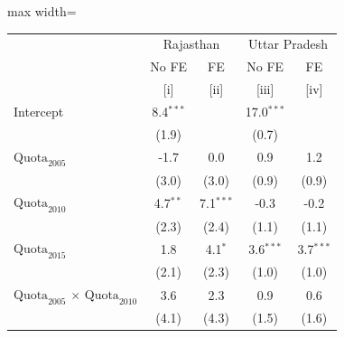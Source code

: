 
\begingroup
\centering
\scriptsize
\begin{adjustbox}{max width=\linewidth}
   \begin{threeparttable}[b]
      \begin{tabular}{lcccc}
         \toprule
          & \multicolumn{2}{c}{Rajasthan} & \multicolumn{2}{c}{Uttar Pradesh} \\
                                                                                                  & No FE       & FE          & No FE        & FE \\
                                                                                                  & [i]         & [ii]        & [iii]        & [iv]\\
         \midrule
         Intercept                                                                                & 8.4$^{***}$ &             & 17.0$^{***}$ &   \\
                                                                                                  & (1.9)       &             & (0.7)        &   \\
         $\text{Quota}_{2005}$                                                                    & -1.7        & 0.0         & 0.9          & 1.2\\
                                                                                                  & (3.0)       & (3.0)       & (0.9)        & (0.9)\\
         $\text{Quota}_{2010}$                                                                    & 4.7$^{**}$  & 7.1$^{***}$ & -0.3         & -0.2\\
                                                                                                  & (2.3)       & (2.4)       & (1.1)        & (1.1)\\
         $\text{Quota}_{2015}$                                                                    & 1.8         & 4.1$^{*}$   & 3.6$^{***}$  & 3.7$^{***}$\\
                                                                                                  & (2.1)       & (2.3)       & (1.0)        & (1.0)\\
         $\text{Quota}_{2005}$ $\times$ $\text{Quota}_{2010}$                                     & 3.6         & 2.3         & 0.9          & 0.6\\
                                                                                                  & (4.1)       & (4.3)       & (1.5)        & (1.6)\\

\end{tabular}
\end{threeparttable}
\end{adjustbox}
